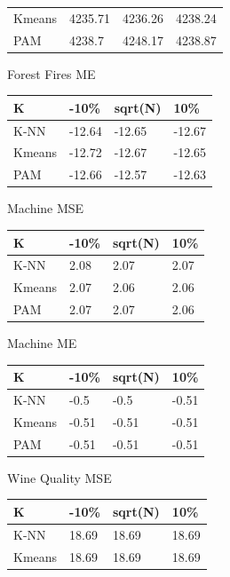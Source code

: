 \documentclass[twoside,11pt]{article}
\begin{document}
\begin{table}[h]
\begin{minipage}[b]{0.45\linewidth}
\begin{tabular}{llll}
			Kmeans & 4235.71 & 4236.26 & 4238.24 \\
			PAM    & 4238.7  & 4248.17 & 4238.87
		\end{tabular}
	\end{minipage}
	\hspace{0.5cm}\centering
	\begin{minipage}[b]{0.45\linewidth}
		Forest Fires ME
		\centering
		\begin{tabular}{llll}
			\hline
			K      & -10\%  & sqrt(N) & 10\%   \\ \hline
			K-NN   & -12.64 & -12.65  & -12.67 \\
			Kmeans & -12.72 & -12.67  & -12.65 \\
			PAM    & -12.66 & -12.57  & -12.63
		\end{tabular}
	\end{minipage}
	\begin{minipage}[b]{0.45\linewidth}\centering
		Machine MSE
		\begin{tabular}{llll}
			\hline
			K      & -10\% & sqrt(N) & 10\% \\ \hline
			K-NN   & 2.08  & 2.07    & 2.07 \\
			Kmeans & 2.07  & 2.06    & 2.06 \\
			PAM    & 2.07  & 2.07    & 2.06
		\end{tabular}
	\end{minipage}
	\hspace{0.5cm}\centering
	\begin{minipage}[b]{0.45\linewidth}
		Machine ME
		\centering
		\begin{tabular}{llll}
			\hline
			K      & -10\% & sqrt(N) & 10\%  \\ \hline
			K-NN   & -0.5  & -0.5    & -0.51 \\
			Kmeans & -0.51 & -0.51   & -0.51 \\
			PAM    & -0.51 & -0.51   & -0.51
		\end{tabular}
	\end{minipage}
	\centering
	\begin{minipage}[b]{0.45\linewidth}\centering
		Wine Quality MSE
		\begin{tabular}{llll}
			\hline
			K      & -10\% & sqrt(N) & 10\%  \\ \hline
			K-NN   & 18.69 & 18.69   & 18.69 \\
			Kmeans & 18.69 & 18.69   & 18.69 \\

\end{tabular}
\end{minipage}
\end{table}
\end{document}

